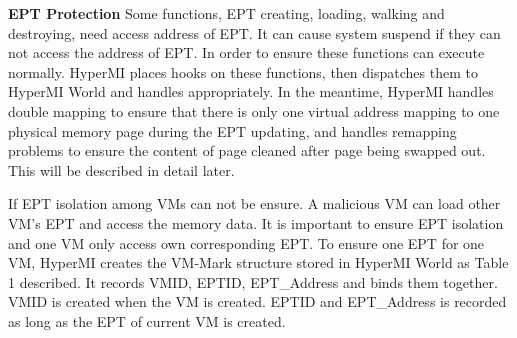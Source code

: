 \documentclass[conference]{IEEEtran}
\begin{document}
\textbf{EPT Protection}
Some functions, EPT creating, loading, walking and destroying, need access address of EPT. It can cause system suspend if they can not access the address of EPT. In order to ensure these functions can execute normally. HyperMI places hooks on these functions, then dispatches them to HyperMI World and handles appropriately. In the meantime, HyperMI handles double mapping to ensure that there is only one virtual address mapping to one physical memory page during the EPT updating, and handles remapping problems to ensure the content of page cleaned after page being swapped out. This will be described in detail later.

If EPT isolation among VMs can not be ensure. A malicious VM can load other VM's EPT and access the memory data. It is important to ensure EPT isolation and one VM only access own corresponding EPT.
To ensure one EPT for one VM, HyperMI creates the VM-Mark structure stored in HyperMI World as Table 1 described. It records VMID, EPTID, EPT\_Address and binds them together. VMID is created when the VM is created. 
 EPTID and EPT\_Address is recorded as long as the EPT of current VM is created.


%
\end{document}

